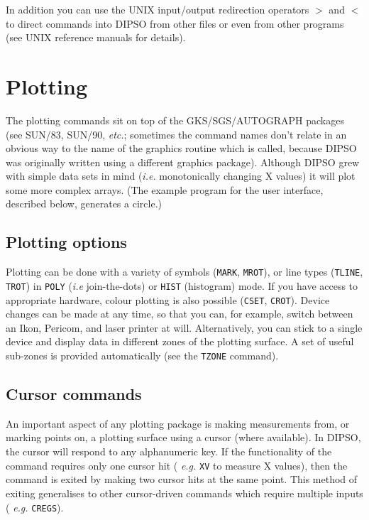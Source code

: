 \documentclass[twoside,11pt]{article}
\newcommand{\htmlref}[2]{#1}
\newcommand{\xref}[3]{#1}
\renewcommand{\_}{\texttt{\symbol{95}}}
\begin{document}
In addition you can use the UNIX input/output redirection operators
\(>\) and \(<\) to direct commands into DIPSO from other files or even
from other programs (see UNIX reference manuals for details).

\section {Plotting}

The plotting commands sit on top of the GKS/SGS/AUTOGRAPH packages (see
\xref{SUN/83}{sun83}{}, \xref{SUN/90}{sun90}{}, {\em etc.}; sometimes the
command names don't relate in an obvious way to the name of the graphics
routine which is called, because DIPSO was originally written using a
different graphics package). Although DIPSO grew with simple data sets in
mind ({\em i.e.} monotonically changing X values) it will plot some more
complex arrays. (The example program for the user interface, described
below, generates a circle.)

\subsection {Plotting options}

Plotting can be done with a variety of symbols (\htmlref{{\tt{MARK}}}{COM:MARK},  \htmlref{{\tt{MROT}}}{COM:MROT}), 
or line types (\htmlref{{\tt{TLINE}}}{COM:TLINE},  \htmlref{{\tt{TROT}}}{COM:TROT})  in \htmlref{{\tt{POLY}}}{COM:POLY}  ({\em i.e}
join-the-dots) or \htmlref{{\tt{HIST}}}{COM:HIST}  (histogram) mode. If you have access to
appropriate hardware, colour plotting is also possible (\htmlref{{\tt{CSET}}}{COM:CSET}, 
\htmlref{{\tt{CROT}}}{COM:CROT}).  Device changes can be made at any time, so that you can, for
example, switch between an Ikon, Pericom, and laser printer at will.
Alternatively, you can stick to a single device and display data in
different zones of the plotting surface. A set of useful sub-zones is
provided automatically (see the \htmlref{{\tt{TZONE}}}{COM:TZONE}  command).

\subsection {Cursor commands}

An important aspect of any plotting package is making measurements
from, or marking points on, a plotting surface using a cursor (where
available). In DIPSO, the cursor will respond to any alphanumeric key.
If the functionality of the command requires only one cursor hit ({\em
e.g.} \htmlref{{\tt{XV}}}{COM:XV}  to measure X values), then the command is exited by making
two cursor hits at the same point. This method of exiting generalises
to other cursor-driven commands which require multiple inputs ({\em
e.g.} \htmlref{{\tt{CREGS}}}{COM:CREGS}). 
\end{document}
